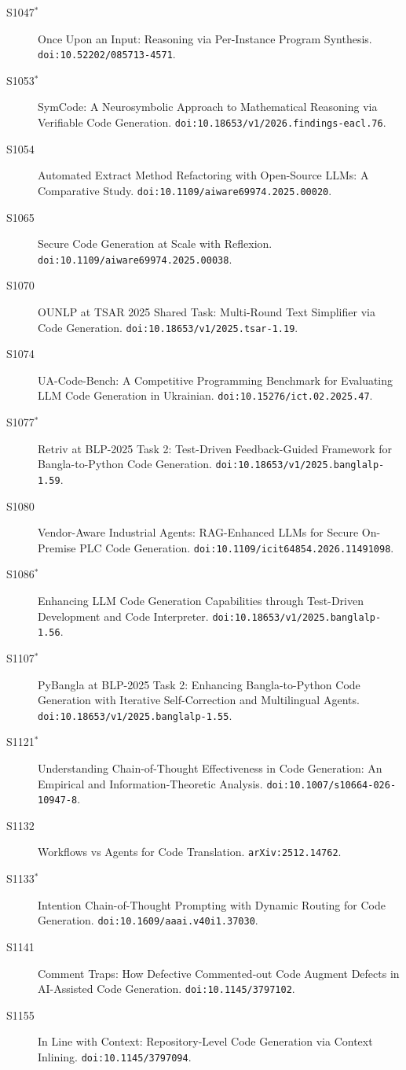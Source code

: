 {\begin{description}
\item[S1047$^\ast$] Once Upon an Input: Reasoning via Per-Instance Program Synthesis. \texttt{doi:10.52202/085713-4571}.
\item[S1053$^\ast$] SymCode: A Neurosymbolic Approach to Mathematical Reasoning via Verifiable Code Generation. \texttt{doi:10.18653/v1/2026.findings-eacl.76}.
\item[S1054] Automated Extract Method Refactoring with Open-Source LLMs: A Comparative Study. \texttt{doi:10.1109/aiware69974.2025.00020}.
\item[S1065] Secure Code Generation at Scale with Reflexion. \texttt{doi:10.1109/aiware69974.2025.00038}.
\item[S1070] OUNLP at TSAR 2025 Shared Task: Multi-Round Text Simplifier via Code Generation. \texttt{doi:10.18653/v1/2025.tsar-1.19}.
\item[S1074] UA-Code-Bench: A Competitive Programming Benchmark for Evaluating LLM Code Generation in Ukrainian. \texttt{doi:10.15276/ict.02.2025.47}.
\item[S1077$^\ast$] Retriv at BLP-2025 Task 2: Test-Driven Feedback-Guided Framework for Bangla-to-Python Code Generation. \texttt{doi:10.18653/v1/2025.banglalp-1.59}.
\item[S1080] Vendor-Aware Industrial Agents: RAG-Enhanced LLMs for Secure On-Premise PLC Code Generation. \texttt{doi:10.1109/icit64854.2026.11491098}.
\item[S1086$^\ast$] Enhancing LLM Code Generation Capabilities through Test-Driven Development and Code Interpreter. \texttt{doi:10.18653/v1/2025.banglalp-1.56}.
\item[S1107$^\ast$] PyBangla at BLP-2025 Task 2: Enhancing Bangla-to-Python Code Generation with Iterative Self-Correction and Multilingual Agents. \texttt{doi:10.18653/v1/2025.banglalp-1.55}.
\item[S1121$^\ast$] Understanding Chain-of-Thought Effectiveness in Code Generation: An Empirical and Information-Theoretic Analysis. \texttt{doi:10.1007/s10664-026-10947-8}.
\item[S1132] Workflows vs Agents for Code Translation. \texttt{arXiv:2512.14762}.
\item[S1133$^\ast$] Intention Chain-of-Thought Prompting with Dynamic Routing for Code Generation. \texttt{doi:10.1609/aaai.v40i1.37030}.
\item[S1141] Comment Traps: How Defective Commented-out Code Augment Defects in AI-Assisted Code Generation. \texttt{doi:10.1145/3797102}.
\item[S1155] In Line with Context: Repository-Level Code Generation via Context Inlining. \texttt{doi:10.1145/3797094}.

\end{description}}
